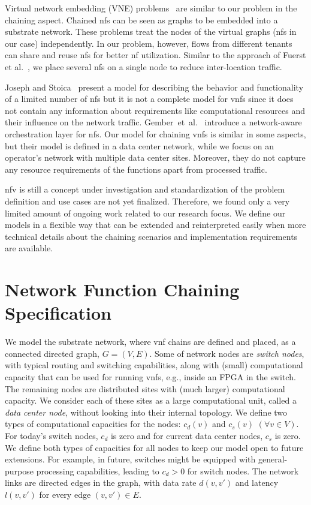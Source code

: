 \documentclass[10pt,a4paper,conference]{IEEEtran}
\begin{document}
Virtual network embedding (VNE) problems~\cite{Fischer2013} are similar to our problem 
in the chaining aspect. Chained \acp{nf} can be seen as graphs to be 
embedded into a substrate network. These problems treat the nodes of the virtual graphs 
(\acp{nf} in our case) independently. In our problem, however, flows from different 
tenants can share and reuse \acp{nf} for better \ac{nf} utilization.
Similar to the approach of Fuerst et al.~\cite{Fuerst2013}, we place several 
\acp{nf} on a single node to reduce inter-location traffic.

Joseph and Stoica~\cite{Joseph2008} present a model for describing the behavior 
and functionality of a limited number of \acp{nf} but it is not a complete model 
for \acp{vnf} since it does not contain any information about requirements like 
computational resources and their influence on the network traffic. 
Gember~et~al.~\cite{gember2013stratos} introduce a network-aware orchestration 
layer for \acp{nf}. Our model for chaining \acp{vnf} is similar in some
aspects, but their model is defined in a data center network, while we focus on an operator's network with multiple data center sites. 
Moreover, they do not capture any resource requirements of the functions 
apart from processed traffic. 

\ac{nfv} is still a concept under investigation and standardization of the problem 
definition and use cases are not yet finalized. Therefore, we found only a very 
limited amount of ongoing work related to our research focus. We define our models in 
a flexible way that can be extended and reinterpreted easily when more
technical details about the chaining scenarios and implementation requirements are
available.

\section{Network Function Chaining Specification}
\label{sec:specification}

We model the substrate network, where \ac{vnf} chains are defined and placed, 
as a connected directed graph, $ G {=} (V,E) $. 
Some of network nodes are \emph{switch nodes}, with typical routing and 
switching capabilities, along with (small) computational capacity that can be 
used for running \acp{vnf}, e.g., inside an FPGA in the switch. The remaining nodes 
are distributed sites with (much larger) computational capacity. We consider 
each of these sites as a large computational unit, called a 
\emph{data center node}, without looking into their internal topology. 
We define two types of computational capacities for the nodes: 
$ c_d(v) $ and $ c_s(v) $ $ (\forall v {\in} V) $. For today's switch nodes, $ c_d $
is zero and for current data center nodes, $ c_s $ is zero. We define 
both types of capacities for all nodes to keep our model open to future extensions. 
For example, in future, switches might be equipped
with general-purpose processing capabilities, leading to $ c_d > 0 $ for switch nodes.
The network links are directed edges in the graph, with data rate 
$ d(v,v') $ and latency $ l(v,v') $ for every edge $ (v,v') {\in} E $.
\end{document}
